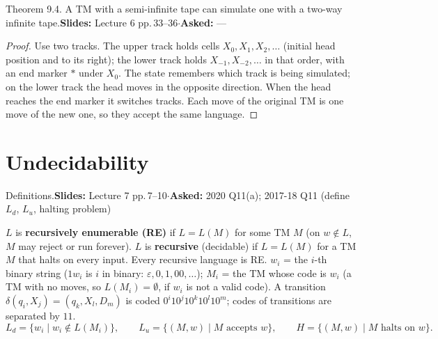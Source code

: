 \documentclass[10.5pt,a4paper]{article}
\newcommand{\src}[2]{{\footnotesize\color{gray!70!black}\textbf{Slides:} #1\enspace$\cdot$\enspace\textbf{Asked:} #2}\par}
\newcommand{\eps}{\varepsilon}
\newcommand{\Ld}{L_d}
\newcommand{\Lu}{L_u}
\begin{document}
\begin{thm}{Theorem 9.4. A TM with a semi-infinite tape can simulate one with a two-way infinite tape.}\src{Lecture 6 pp.\,33--36}{---}\end{thm}
\begin{proof}
Use two tracks. The upper track holds cells $X_0,X_1,X_2,\dots$ (initial head position and to its right); the lower track holds
$X_{-1},X_{-2},\dots$ in that order, with an end marker $*$ under $X_0$. The state remembers which track is being simulated; on the lower
track the head moves in the opposite direction. When the head reaches the end marker it switches tracks. Each move of the original TM is
one move of the new one, so they accept the same language.
\end{proof}

\section{Undecidability}

\begin{thm}{Definitions.}\src{Lecture 7 pp.\,7--10}{2020 Q11(a); 2017-18 Q11 (define $\Ld$, $\Lu$, halting problem)}\end{thm}
$L$ is \textbf{recursively enumerable (RE)} if $L=L(M)$ for some TM $M$ (on $w\notin L$, $M$ may reject or run forever). $L$ is
\textbf{recursive} (decidable) if $L=L(M)$ for a TM $M$ that halts on every input. Every recursive language is RE.
$w_i$ = the $i$-th binary string ($1w_i$ is $i$ in binary: $\eps,0,1,00,\dots$); $M_i$ = the TM whose code is $w_i$ (a TM with no moves, so
$L(M_i)=\emptyset$, if $w_i$ is not a valid code). A transition $\delta(q_i,X_j)=(q_k,X_l,D_m)$ is coded $0^i10^j10^k10^l10^m$; codes of
transitions are separated by $11$.
\[\Ld=\{w_i\mid w_i\notin L(M_i)\},\qquad \Lu=\{(M,w)\mid M \text{ accepts } w\},\qquad H=\{(M,w)\mid M \text{ halts on } w\}.\]
\end{document}
